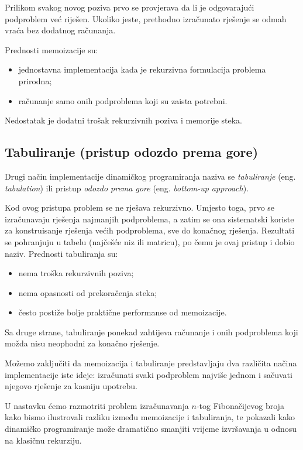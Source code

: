 Prilikom svakog novog poziva prvo se provjerava da li je odgovarajući podproblem već riješen. Ukoliko jeste, prethodno izračunato rješenje se odmah vraća bez dodatnog računanja.

\medskip

Prednosti memoizacije su:

\begin{itemize}
	\item jednostavna implementacija kada je rekurzivna formulacija problema prirodna;
	\item računanje samo onih podproblema koji su zaista potrebni.
\end{itemize}

Nedostatak je dodatni trošak rekurzivnih poziva i memorije steka.

\subsection*{Tabuliranje (pristup odozdo prema gore)}

Drugi način implementacije dinamičkog programiranja naziva se \textit{tabuliranje} (eng. \emph{tabulation}) ili pristup \textit{odozdo prema gore} (eng. \emph{bottom-up approach}).

Kod ovog pristupa problem se ne rješava rekurzivno. Umjesto toga, prvo se izračunavaju rješenja najmanjih podproblema, a zatim se ona sistematski koriste za konstruisanje rješenja većih podproblema, sve do konačnog rješenja.  Rezultati se pohranjuju u tabelu (najčešće niz ili matricu), po čemu je ovaj pristup i dobio naziv.  Prednosti tabuliranja su:

\begin{itemize}
	\item nema troška rekurzivnih poziva;
	\item nema opasnosti od prekoračenja steka;
	\item često postiže bolje praktične performanse od memoizacije.
\end{itemize}

Sa druge strane, tabuliranje ponekad zahtijeva računanje i onih podproblema koji možda nisu neophodni za konačno rješenje.

\medskip

Možemo zaključiti da memoizacija i tabuliranje predstavljaju dva različita načina implementacije iste ideje: izračunati svaki podproblem najviše jednom i sačuvati njegovo rješenje za kasniju upotrebu.

U nastavku ćemo razmotriti problem izračunavanja $n$-tog Fibonačijevog broja kako bismo ilustrovali razliku između memoizacije i tabuliranja, te pokazali kako dinamičko programiranje može dramatično smanjiti vrijeme izvršavanja u odnosu na klasičnu rekurziju.


